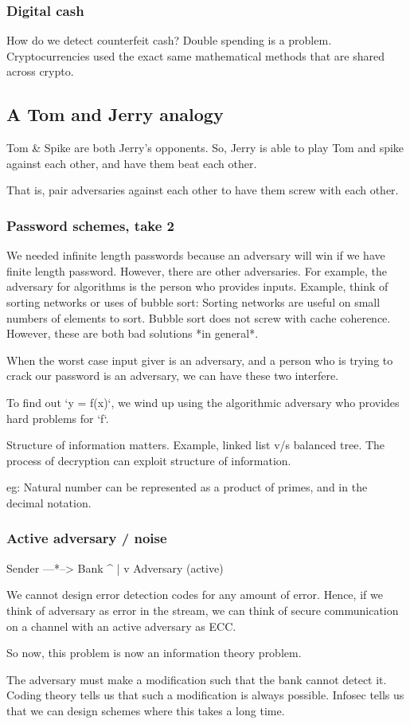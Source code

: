 \subsubsection{Digital cash}
How do we detect counterfeit cash? Double spending is a problem. Cryptocurrencies
used the exact same mathematical methods that are shared across crypto. 

\subsection{A Tom and Jerry analogy}
Tom & Spike are both Jerry's opponents. So, Jerry is able to play Tom and spike
against each other, and have them beat each other. 

That is, pair adversaries against each other to have them screw with each other.

\subsubsection{Password schemes, take 2}
We needed infinite length passwords because an adversary will win if we have finite
length password. However, there are other adversaries. For example, the adversary
for algorithms is the person who provides inputs. Example, think of sorting networks
or uses of bubble sort: Sorting networks are useful on small numbers of elements
to sort. Bubble sort does not screw with cache coherence. However, these are both
bad solutions *in general*.
 
When the worst case input giver is an adversary, and a person who is trying to
crack our password is an adversary, we can have these two interfere.

To find out `y = f(x)`, we wind up using the algorithmic adversary who
provides hard problems for `f`.


Structure of information matters. Example, linked list v/s balanced tree. The
process of decryption can exploit structure of information.


eg: Natural number can be represented as a product of primes, and in the
decimal notation.


\subsubsection{Active adversary / noise}
\begin{listing}
Sender ---*--> Bank
          ^
          |
          v
      Adversary (active)
\end{listing}

We cannot design error detection codes for any amount of error. Hence, if
we think of adversary as error in the stream, we can think of secure communication
on a channel with an active adversary as ECC.

So now, this problem is now an information theory problem. 

The adversary must make a modification such that the bank cannot detect it.
Coding theory tells us that such a modification is always possible. Infosec
tells us that we can design schemes where this takes a long time.

